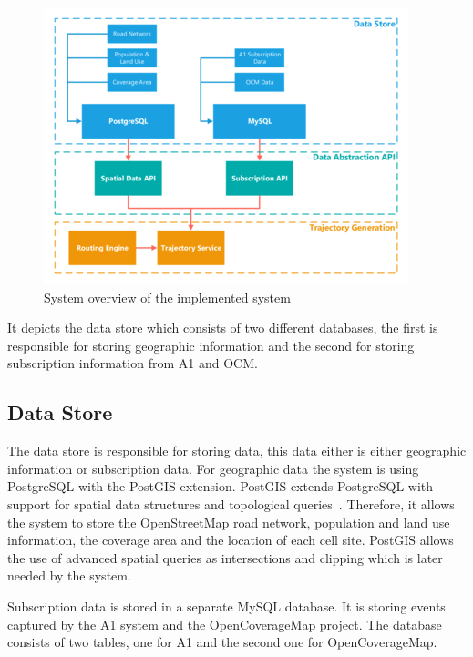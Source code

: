 \documentclass[master,english]{hgbthesis}
\begin{document}
\begin{figure}

\centering

\includegraphics[width=\linewidth]{./images/systemoverview.png}

\caption{System overview of the implemented system}

\label{fig:systemoverview}

\end{figure}

It depicts the data store which consists of two different databases, the first is responsible for storing geographic information and the second for storing subscription information from A1 and OCM.

\subsection{Data Store}

The data store is responsible for storing data, this data either is either geographic information or subscription data. For geographic data the system is using PostgreSQL with the PostGIS extension. PostGIS extends PostgreSQL with support for spatial data structures and topological queries~\cite{Obe2011}. Therefore, it allows the system to store the OpenStreetMap road network, population and land use information, the coverage area and the location of each cell site. PostGIS allows the use of advanced spatial queries as intersections and clipping which is later needed by the system.

Subscription data is stored in a separate MySQL database. It is storing events captured by the A1 system and the OpenCoverageMap project. The database consists of two tables, one for A1 and the second one for OpenCoverageMap.
\end{document}
